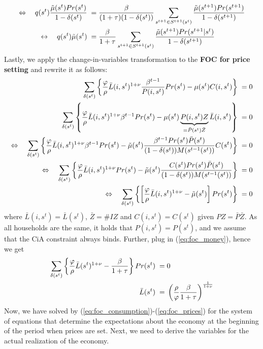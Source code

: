 \documentclass[a4paper, 12pt]{article}
\begin{document}
\begin{Answer}
\begin{align}
		\Leftrightarrow \quad q(s^t) \frac{\tilde{\mu}(s^t) Pr(s^t)}{1-\delta(s^t)} \; = & \; \frac{\beta}{(1+\tau)(1-\delta(s^t))} \sum_{s^{t+1} \in S^{t+1}(s^t)} \frac{\tilde{\mu}(s^{t+1}) Pr(s^{t+1})}{1-\delta(s^{t+1})}\notag\\%
		\leftrightarrow \quad q(s^t) \tilde{\mu}(s^t) \; = & \; \frac{\beta}{1+\tau} \sum_{s^{t+1} \in S^{t+1}(s^t)} \frac{\tilde{\mu}(s^{t+1}) Pr(s^{t+1}|s^t)}{1-\delta(s^{t+1})}%
	\end{align}%
	Lastly, we apply the change-in-variables transformation to the \textbf{FOC for price setting} and rewrite it as follows:%
	\begin{align}%
		\sum_{\delta(s^t)} \left\{ \frac{\varphi}{\rho} \bar{L}(i,s^t)^{1+\nu} \frac{\beta^{t-1}}{P(i,s^t)} Pr(s^t) - \mu(s^t) C(i,s^t) \right\} \; = & \; 0\notag\\%
		\sum_{\delta(s^t)} \left\{ \frac{\varphi}{\rho} \bar{L}(i,s^t)^{1+\nu} \beta^{t-1} Pr(s^t) - \mu(s^t) \underbrace{P(i,s^t) Z}_{= \bar{P}(s^t) \bar{Z}} \bar{L}(i,s^t) \right\} \; = & \; 0\notag\\%
		\Leftrightarrow \quad \sum_{\delta(s^t)} \left\{ \frac{\varphi}{\rho} \bar{L}(i,s^t)^{1+\nu} \beta^{t-1} Pr(s^t) - \tilde{\mu}(s^t) \frac{\beta^{t-1} Pr(s^t) \bar{P}(s^t)}{(1-\delta(s^t)) M(s^{t-1}(s^t))} C(s^t) \right\} \; = & \; 0\notag\\%
		\Leftrightarrow \quad \sum_{\delta(s^t)} \left\{ \frac{\varphi}{\rho} \bar{L}(i,s^t)^{1+\nu} Pr(s^t) - \tilde{\mu}(s^t) \frac{C(s^t) Pr(s^t) \bar{P}(s^t)}{(1-\delta(s^t)) M(s^{t-1}(s^t))} \right\} \; = & \; 0\notag\\%
		\Leftrightarrow \quad \sum_{\delta(s^t)} \left\{ \left[ \frac{\varphi}{\rho} \bar{L}(i,s^t)^{1+\nu} - \tilde{\mu}(s^t) \right] Pr(s^t) \right\} \; = & \; 0\notag%
	\end{align}%
	where $\bar{L}(i,s^t) = \bar{L}(s^t)$, $\bar{Z} = \#I Z$ and $C(i,s^t) = C(s^t)$ given $P Z = \bar{P} \bar{Z}$. As all households are the same, it holds that $P(i,s^t) = P(s^t)$, and we assume that the CiA constraint always binds. Further, plug in (\ref{eq:foc_money}), hence we get%
	\begin{align}%
		\sum_{\delta(s^t)} \left\{ \frac{\varphi}{\rho} \bar{L}(s^t)^{1+\nu} - \frac{\beta}{1+\tau} \right\} Pr(s^t) \; = & \; 0\notag\\%
		\bar{L}(s^t) \; = & \; \left( \frac{\rho}{\varphi} \frac{\beta}{1+\tau} \right)^{\frac{1}{1+\nu}}\label{eq:foc_prices}%
	\end{align}%
	Now, we have solved by (\ref{eq:foc_consumption})-(\ref{eq:foc_prices}) for the system of equations that determine the expectations about the economy at the beginning of the period when prices are set. Next, we need to derive the variables for the actual realization of the economy.\\%

\end{Answer}
\end{document}
